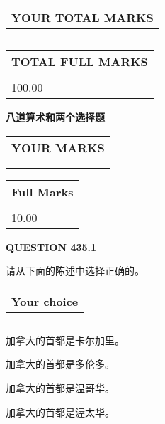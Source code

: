\documentclass{ctexart}
\begin{document}
   
\vspace{0.2in}\noindent\begin{tabular}{|l|}
\hline
YOUR TOTAL MARKS  \\
\hline
 \\ 
 \\ 
\hline
\end{tabular}
\hspace{0.05in} \begin{tabular}{|l|}
\hline
TOTAL FULL MARKS  \\
\hline
 \\ 
100.00 \\
\hline
\end{tabular}
   
   
 \vspace{0.2in}
{\LARGE {\textbf{ 八道算术和两个选择题}}}
   
   
  
\vspace{0.2in}
  
\noindent\begin{tabular}{|l|}
\hline
 YOUR MARKS  \\
\hline
 \\ 
 \\ 
\hline
\end{tabular}
\hspace{0.05in} \begin{tabular}{|l|}
\hline
 Full Marks  \\
\hline
 \\ 
10.00 \\
\hline
\end{tabular}
{\textbf{\Large{QUESTION
435.1 
}}}
  
  
请从下面的陈述中选择正确的。
  
  
\noindent\hspace{3.0in} \begin{tabular}{|l|}
\hline
Your choice \\
\hline
 \\ 
 \\ 
\hline
\end{tabular}
  
  
 
 
加拿大的首都是卡尔加里。
 
 
加拿大的首都是多伦多。
 
 
加拿大的首都是温哥华。
 
 
加拿大的首都是渥太华。
 
\end{document}

